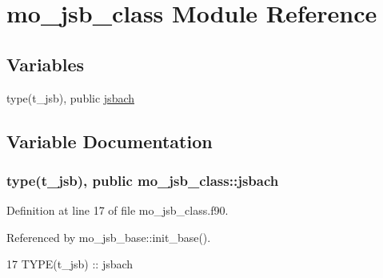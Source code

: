 \hypertarget{namespacemo__jsb__class}{}\section{mo\+\_\+jsb\+\_\+class Module Reference}
\label{namespacemo__jsb__class}
\subsection*{Variables}
\begin{DoxyCompactItemize}
\item 
type(t\+\_\+jsb), public \hyperlink{namespacemo__jsb__class_a05ebd478dbddfcc8bb94cba5047c65b7}{jsbach}
\end{DoxyCompactItemize}


\subsection{Variable Documentation}
\hypertarget{namespacemo__jsb__class_a05ebd478dbddfcc8bb94cba5047c65b7}{}
\subsubsection[{jsbach}]{\setlength{\rightskip}{0pt plus 5cm}type(t\+\_\+jsb), public mo\+\_\+jsb\+\_\+class\+::jsbach}\label{namespacemo__jsb__class_a05ebd478dbddfcc8bb94cba5047c65b7}


Definition at line 17 of file mo\+\_\+jsb\+\_\+class.\+f90.



Referenced by mo\+\_\+jsb\+\_\+base\+::init\+\_\+base().


\begin{DoxyCode}
17   \textcolor{keywordtype}{TYPE}(t\_jsb) :: jsbach
\end{DoxyCode}
